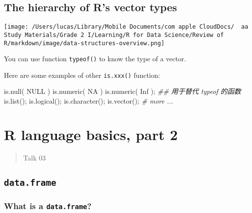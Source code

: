 \documentclass[
]{article}
\let\oldincludegraphics\includegraphics
\renewcommand{\includegraphics}[2][]{\begin{center}\oldincludegraphics[#1]{#2}\end{center}}
\newenvironment{Shaded}{}{}
\newcommand{\CommentTok}[1]{\textcolor[rgb]{0.38,0.63,0.69}{\textit{#1}}}
\newcommand{\ConstantTok}[1]{\textcolor[rgb]{0.53,0.00,0.00}{#1}}
\newcommand{\DocumentationTok}[1]{\textcolor[rgb]{0.73,0.13,0.13}{\textit{#1}}}
\newcommand{\FunctionTok}[1]{\textcolor[rgb]{0.02,0.16,0.49}{#1}}
\newcommand{\NormalTok}[1]{#1}
\begin{document}
\hypertarget{the-hierarchy-of-rs-vector-types}{%
\subsection{The hierarchy of R's vector
types}\label{the-hierarchy-of-rs-vector-types}}

\texttt{[image: /Users/lucas/Library/Mobile Documents/com~apple~CloudDocs/~~aa Study Materials/Grade 2 I/Learning/R for Data Science/Review of R/markdown/image/data-structures-overview.png]}

You can use function \texttt{typeof()} to know the type of a vector.

Here are some examples of other \texttt{is.xxx()} function:

\begin{Shaded}
\begin{Highlighting}[]
\FunctionTok{is.null}\NormalTok{( }\ConstantTok{NULL}\NormalTok{ )}
\FunctionTok{is.numeric}\NormalTok{( }\ConstantTok{NA}\NormalTok{ )}
\FunctionTok{is.numeric}\NormalTok{( }\ConstantTok{Inf}\NormalTok{ );}
\DocumentationTok{\#\# 用于替代 typeof 的函数}
\FunctionTok{is.list}\NormalTok{();}
\FunctionTok{is.logical}\NormalTok{();}
\FunctionTok{is.character}\NormalTok{();}
\FunctionTok{is.vector}\NormalTok{();}
\CommentTok{\# more ...}
\end{Highlighting}
\end{Shaded}

\newpage
\hypertarget{r-language-basics-part-2}{%
\section{R language basics, part 2}\label{r-language-basics-part-2}}

\begin{quote}
Talk 03
\end{quote}

\hypertarget{dataframe}{%
\subsection{\texorpdfstring{\texttt{data.frame}}{data.frame}}\label{dataframe}}

\hypertarget{what-is-a-dataframe}{%
\subsubsection{\texorpdfstring{\textbf{What is a
\texttt{data.frame}?}}{What is a data.frame?}}\label{what-is-a-dataframe}}
\end{document}
